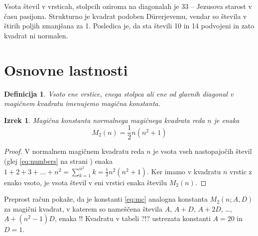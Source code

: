 \documentclass[a4paper,12pt]{article}
\newtheorem{definicija}{Definicija}}
\newtheorem{izrek}{Izrek}}
\begin{document}
Vsota števil v vrsticah, stolpcih oziroma na diagonalah je 33 -- Jezusova starost
v času pasijona. Strukturno je kvadrat podoben Dürerjevemu, vendar so števila
v štirih poljih zmanjšana za 1. Posledica je, da sta števili 10 in 14 podvojeni
in zato kvadrat ni normalen.
%


\section{Osnovne lastnosti}

\begin{definicija}
      Vsoto ene vrstice, enega stolpca ali ene od glavnih diagonal
      v magičnem kvadratu imenujemo \emph{magična konstanta}.
\end{definicija}

  
  \begin{izrek}
    Magična konstanta normalnega magičnega kvadrata reda $n$
    je enaka
    \begin{equation}
      \label{eq:mc}
       M_2(n) = \frac{1}{2} n(n^2+1)
    \end{equation}
  \end{izrek}

  
  \begin{proof}
    V normalnem magičnem kvadratu reda $n$ je vsota vseh nastopajočih
    števil (glej \ref{eq:numbers} na strani \pageref{eq:numbers}) enaka
    $1+2+3+\dots+n^2=\sum_{k=1}^{n^2}k=\frac{1}{2}n^2(n^2+1)$. Ker imamo
    v kvadratu $n$ vrstic z enako vsoto, je vsota števil v eni vrstici
    enaka številu $M_2(n)$. 
  \end{proof}%

Preprost račun pokaže, da je konstanti \ref{eq:mc} analogna konstanta
$M_2(n;A,D)$ za magični kvadrat, v katerem so nameščena števila
$A$, $A+D$, $A+2D$, \dots, $A+(n^2-1)D$, enaka %
!!
Kvadratu v tabeli ?!? ustrezata konstanti $A=20$ in $D=1$.
\end{document}
